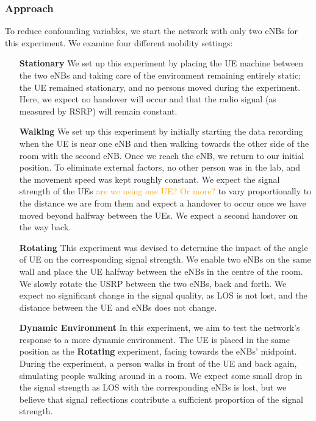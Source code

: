\subsubsection{Approach}
To reduce confounding variables, we start the network with only two eNBs for this experiment. We examine four different mobility settings:
\begin{itemize}
    \item[\textbf{Stationary}] We set up this experiment by placing the UE machine between the two eNBs and taking care of the environment remaining entirely static; the UE remained stationary, and no persons moved during the experiment. Here, we expect no handover will occur and that the radio signal (as measured by RSRP) will remain constant.
    \item[\textbf{Walking}] We set up this experiment by initially starting the data recording when the UE is near one eNB and then walking towards the other side of the room with the second eNB. Once we reach the eNB, we return to our initial position. To eliminate external factors, no other person was in the lab, and the movement speed was kept roughly constant. We expect the signal strength of the UEs \textcolor{orange}{are we using one UE? Or more?} to vary proportionally to the distance we are from them and expect a handover to occur once we have moved beyond halfway between the UEs. We expect a second handover on the way back.
    \item[\textbf{Rotating}] This experiment was devised to determine the impact of the angle of UE on the corresponding signal strength. We enable two eNBs on the same wall and place the UE halfway between the eNBs in the centre of the room. We slowly rotate the USRP between the two eNBs, back and forth. We expect no significant change in the signal quality, as LOS is not lost, and the distance between the UE and eNBs does not change.
    \item[\textbf{Dynamic Environment}] In this experiment, we aim to test the network's response to a more dynamic environment. The UE is placed in the same position as the \textbf{Rotating} experiment, facing towards the eNBs' midpoint. During the experiment, a person walks in front of the UE and back again, simulating people walking around in a room. We expect some small drop in the signal strength as LOS with the corresponding eNBs is lost, but we believe that signal reflections contribute a sufficient proportion of the signal strength.
\end{itemize}
